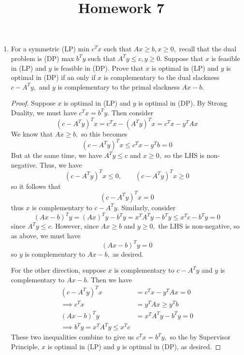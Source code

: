 \documentclass{article}
\begin{document}
\title{Homework 7}
\maketitle
\thispagestyle{fancy}

\begin{enumerate}
	\item For a symmetric (LP) min $c^T x$ such that $Ax\ge b, x\ge 0,$ recall that the dual problem is (DP) max $b^T y$ such that $A^T y\le c, y\ge 0.$ Suppose that $x$ is feasible in (LP) and $y$ is feasible in (DP). Prove that $x$ is optimal in (LP) and $y$ is optimal in (DP) if an only if $x$ is complementary to the dual slackness $c-A^T y,$ and $y$ is complementary to the primal slackness $Ax-b.$
		\begin{proof}
			Suppose $x$ is optimal in (LP) and $y$ is optimal in (DP). By Strong Duality, we must have $c^Tx = b^T y.$ Then consider \[(c-A^T y)^T x = c^Tx - (A^T y)^T x = c^T x - y^T Ax\] We know that $Ax\ge b,$ so this becomes \[(c-A^T y)^T x\le c^T x - y^Tb = 0\] But at the same time, we have $A^Ty\le c$ and $x\ge 0,$ so the LHS is non-negative. Thus, we have \[(c-A^T y)^T x \le 0, \quad\quad (c-A^Ty)^T x\ge 0\] so it follows that \[(c-A^Ty)^T x = 0\] thus $x$ is complementary to $c-A^T y.$
			Similarly, consider \[(Ax-b)^T y = (Ax)^Ty - b^T y = x^T A^T y - b^T y \le x^T c - b^T y = 0\] since $A^T y\le c.$ However, since $Ax\ge b$ and $y\ge 0,$ the LHS is non-negative, so as above, we must have \[(Ax-b)^T y = 0\] so $y$ is complementary to $Ax-b,$ as desired.

			For the other direction, suppose $x$ is complementary to $c-A^T y$ and $y$ is complementary to $Ax-b.$ Then we have
			\begin{align*}
				(c-A^T y)^T x &= c^T x - y^T Ax = 0 \\
				\implies c^T x &= y^T Ax \ge y^T b \\
				(Ax-b)^T y&= x^T A^T y - b^T y = 0 \\
				\implies b^T y = x^T A^T y\le x^T c
			\end{align*}
			These two inequalities combine to give us $c^T x = b^T y,$ so the by Supervisor Principle, $x$ is optimal in (LP) and $y$ is optimal in (DP), as desired.

		\end{proof}


\end{enumerate}
\end{document}
